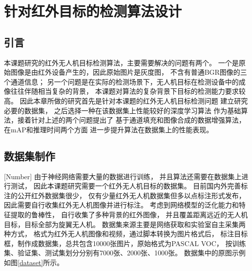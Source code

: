 
\chapter{针对红外目标的检测算法设计}

\section{引言}
本课题研究的红外无人机目标检测算法，主要需要解决的问题有两个。
一个是原始图像是由红外设备产生的，因此原始图片是灰度图，
不含有普通BGR图像的三个通道信息；
另一个问题是在实际的检测场景下，无人机目标在检测设备中的成像往往伴随相当复杂的背景，
本课题对算法的复杂背景下目标的检测能力要求较高。
因此本章所做的研究首先是针对本课题的红外无人机目标检测问题
建立研究必要的数据集，
之后选择一种在该数据集上性能较好的深度学习算法
作为基础算法，接着针对上述的两个问题提出了
基于通道填充和图像合成的数据增强算法，
在mAP和推理时间两个方面
进一步提升算法在数据集上的性能表现。


\section{数据集制作}[Number]
由于神经网络需要大量的数据进行训练，
并且算法还需要在数据集上进行测试，
因此本课题研究需要一个红外无人机目标的数据集。
目前国内外完善标注的公开红外数据集很少，
仅有少量红外无人机数据集但多以点标注形式发布，
因此需要自行收集红外无人机图像并进行标注。
考虑到网络模型的泛化能力和特征提取的鲁棒性，
自行收集了多种背景的红外图像，
并且覆盖距离远近的无人机目标，目标全部为旋翼无人机。
数据集来源主要是网络获取和实验室自主采集两种方式，
格式为红外无人机图像和视频，通过脚本转换为图片格式后，
标注目标框，制作成数据集，总共包含10000张图片，原始格式为PASCAL VOC，
按训练集、验证集、测试集划分分别有7000张、2000张、1000张。
数据集中的原图示例如图\ref{dataset}所示。

